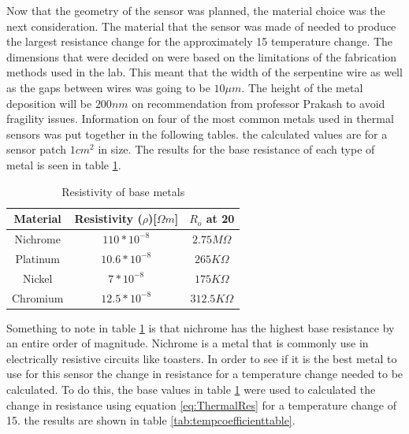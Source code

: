\documentclass[12pt,a4paper]{report}
\begin{document}
Now that the geometry of the sensor was planned, the material choice was the next consideration. The material that the sensor was made of needed to produce the largest resistance change for the approximately 15\textcelsius{} temperature change. The dimensions that were decided on were based on the limitations of the fabrication methods used in the lab. This meant that the width of the serpentine wire as well as the gaps between wires was going to be $10 \mu m$. The height of the metal deposition will be $200nm$ on recommendation from professor Prakash to avoid fragility issues. Information on four of the most common metals used in thermal sensors was put together in the following tables. the calculated values are for a sensor patch $1cm^2$ in size. The results for the base resistance of each type of metal is seen in table \ref{tab:baseResistTable}.

\begin{table}[h!]
    \centering
    \caption{Resistivity of base metals}
    \label{tab:baseResistTable}
    \begin{tabular}{|c|c|c|}
        \hline
        Material & Resistivity ($\rho$)[$\Omega  m$] & $R_o$ at 20\textcelsius{} \\
        \hline
        Nichrome & $110*10^{-8}$ & $2.75M\Omega$ \\
        \hline
        Platinum & $10.6*10^{-8}$ & $265K\Omega$ \\
        \hline
        Nickel & $7*10^{-8}$ & $175K\Omega$ \\
        \hline
        Chromium & $12.5*10^{-8}$ & $312.5K\Omega$ \\
        \hline
    \end{tabular}
\end{table}

Something to note in table \ref{tab:baseResistTable} is that nichrome has the highest base resistance by an entire order of magnitude. Nichrome is a metal that is commonly use in electrically resistive circuits like toasters. In order to see if it is the best metal to use for this sensor the change in resistance for a temperature change needed to be calculated. To do this, the base values in table \ref{tab:baseResistTable} were used to calculated the change in resistance using equation \ref{eq:ThermalRes} for a temperature change of 15\textcelsius{}. the results are shown in table \ref{tab:tempcoefficienttable}.
\end{document}
